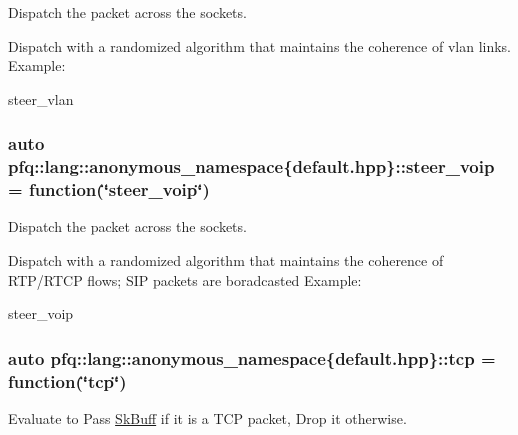 Dispatch the packet across the sockets. 

Dispatch with a randomized algorithm that maintains the coherence of vlan links. Example\+:

steer\+\_\+vlan 
\subsubsection[{\texorpdfstring{steer\+\_\+voip}{steer_voip}}]{\setlength{\rightskip}{0pt plus 5cm}auto pfq\+::lang\+::anonymous\+\_\+namespace\{default.\+hpp\}\+::steer\+\_\+voip = {\bf function}(\char`\"{}steer\+\_\+voip\char`\"{})}\hypertarget{namespacepfq_1_1lang_1_1anonymous__namespace_02default_8hpp_03_a50fa612c45aa8f8dfd3259e2d0cbfce0}{}\label{namespacepfq_1_1lang_1_1anonymous__namespace_02default_8hpp_03_a50fa612c45aa8f8dfd3259e2d0cbfce0}


Dispatch the packet across the sockets. 

Dispatch with a randomized algorithm that maintains the coherence of R\+T\+P/\+R\+T\+CP flows; S\+IP packets are boradcasted Example\+:

steer\+\_\+voip 
\subsubsection[{\texorpdfstring{tcp}{tcp}}]{\setlength{\rightskip}{0pt plus 5cm}auto pfq\+::lang\+::anonymous\+\_\+namespace\{default.\+hpp\}\+::tcp = {\bf function}(\char`\"{}tcp\char`\"{})}\hypertarget{namespacepfq_1_1lang_1_1anonymous__namespace_02default_8hpp_03_a5b8ca91a33a120e7e0807e63c8b51b28}{}\label{namespacepfq_1_1lang_1_1anonymous__namespace_02default_8hpp_03_a5b8ca91a33a120e7e0807e63c8b51b28}


Evaluate to {\ttfamily Pass} \hyperlink{structpfq_1_1lang_1_1SkBuff}{Sk\+Buff} if it is a T\+CP packet, {\ttfamily Drop} it otherwise. 

